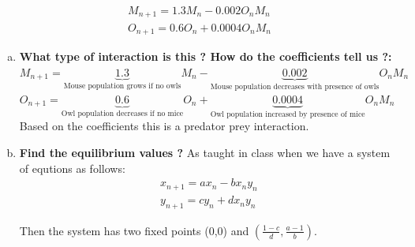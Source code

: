 \documentclass{article}
\begin{document}
\begin{enumerate}[1.]
\begin{gather*}
M_{n+1} = 1.3M_n - 0.002O_nM_n \\
O_{n+1} = 0.6O_n + 0.0004O_nM_n
\end{gather*}

\begin{enumerate}[(a)]
\item
\textbf{What type of interaction is this ? How do the coefficients tell us ?:} \\
$M_{n+1} = \underbrace{1.3}_{\text{Mouse population grows if no owls}}M_n - \underbrace{0.002}_{\text{Mouse population decreases with presence of owls}}O_nM_n$ \\
$O_{n+1} =  \underbrace{0.6}_{\text{Owl population decreases if no mice}}O_n + \underbrace{0.0004}_{\text{Owl population increased by presence of mice}}O_nM_n$ \\

Based on the coefficients this is a predator prey interaction.
\item
\textbf{Find the equilibrium values ?}
As taught in class when we have a system of equtions as follows:
\begin{gather*}
x_{n+1} = ax_n-bx_ny_n \\
y_{n+1} = cy_n + dx_ny_n
\end{gather*}

Then the system has two fixed points (0,0) and $(\frac{1-c}{d},\frac{a-1}{b})$. 


\end{enumerate}
\end{enumerate}
\end{document}

